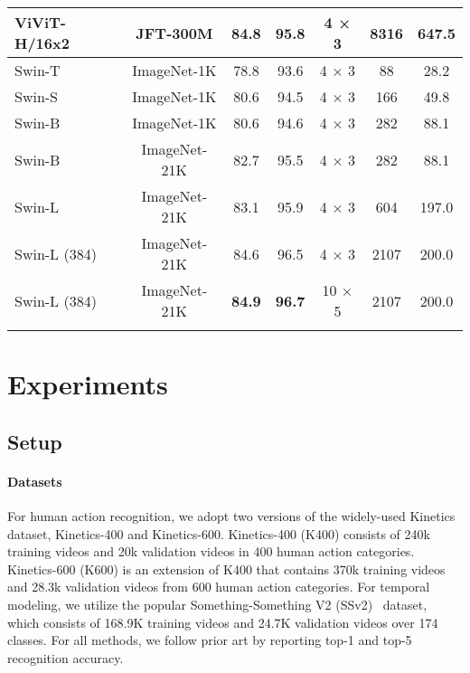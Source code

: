 \documentclass{article}
\newcommand{\demph}[1]{\textcolor[rgb]{0.565,0.565,0.565}{#1}}
\begin{document}
\begin{table}[t]
\begin{tabular}{l|c|cc|c|cc}
  \demph{ViViT-H/16x2~\cite{arnab2021vivit}} & \demph{JFT-300M} & \demph{84.8} & \demph{95.8} & \demph{4 × 3} & \demph{8316}& \demph{647.5}\\
  \hline
  Swin-T & ImageNet-1K & 78.8 & 93.6 & 4 × 3 & 88 & 28.2 \\
  Swin-S & ImageNet-1K & 80.6 & 94.5 & 4 × 3 & 166 & 49.8 \\
  Swin-B & ImageNet-1K & 80.6 & 94.6 & 4 × 3 & 282 & 88.1 \\
Swin-B & ImageNet-21K & 82.7 & 95.5 & 4 × 3 & 282 & 88.1 \\ 
  Swin-L & ImageNet-21K & 83.1 & 95.9 & 4 × 3 & 604 & 197.0 \\
  Swin-L (384) & ImageNet-21K & 84.6 & 96.5 & 4 × 3 & 2107 & 200.0 \\ 
Swin-L (384) & ImageNet-21K & \textbf{84.9} & \textbf{96.7} & 10 × 5 & 2107 & 200.0 \\
\Xhline{1.0pt}
  \end{tabular}
\label{tab:k400}
\end{table}


\section{Experiments}

\subsection{Setup}
\label{subsec:setup}
\paragraph{Datasets} For human action recognition, we adopt two versions of the widely-used Kinetics \cite{kay2017kinetics} dataset, Kinetics-400 and Kinetics-600.
Kinetics-400 (K400) consists of 240k training videos and 20k validation videos in 400 human action categories. 
Kinetics-600 (K600) is an extension of K400 that contains 370k training videos and 28.3k validation videos from 600 human action categories. 
For temporal modeling, we utilize the popular Something-Something V2 (SSv2)~\cite{goyal2017ssv2} dataset, which consists of 168.9K training videos and 24.7K validation videos over 174 classes.
For all methods, we follow prior art by reporting top-1 and top-5 recognition accuracy.
\end{document}
